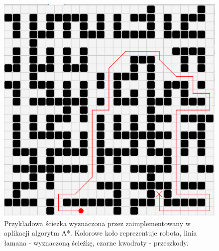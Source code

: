 \begin{figure}
	\centering
	\includegraphics[width=0.5\columnwidth]{img/robopath/astar-simple}
	\caption{Przykładowa ścieżka wyznaczona przez zaimplementowany w aplikacji algorytm A*. Kolorowe koło reprezentuje robota, linia łamana - wyznaczoną ścieżkę, czarne kwadraty - przeszkody.}
	\label{fig:robopath-astar-simple}
\end{figure}

